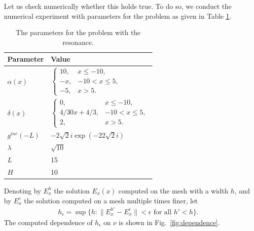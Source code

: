 Let us check numerically whether this holds true. 
To do so, we conduct the  numerical experiment with parameters for the problem as given in Table \ref{tab:parameters}.
\begin{table}[htb!]
\begin{tabular}{l|l}
Parameter & Value \\
\hline
$\alpha(x)$ & $\left\{\begin{array}{lr}
10, & x\leq -10,\\
-x, & -10<x\leq 5,\\
-5, & x>5.
\end{array}\right.$ \\
$\delta(x)$ & 
$\left\{\begin{array}{lr}
0, & x\leq -10,\\
4/30x+4/3,& -10<x\leq 5,\\
2, & x>5.
\end{array}\right.$ \\
$g^{inc}(-L)$ & $-2 \sqrt{2}i\exp(-22\sqrt{2}i)$\\
$\lambda$ & 
$\sqrt{10}$\\
$L$& 15\\
$H$ & 10 \\
\end{tabular}
\caption{The parameters for the problem with the resonance.}
\label{tab:parameters}
\end{table}
Denoting by $E_{x}^{h}$ the solution $E_{x}(x)$ computed on the mesh with a width $h$, and by $E_{x}^{c}$ the solution computed on a mesh multiple times finer, let 
\begin{align}
\label{eq:def_epsilon}
h_{\epsilon}=\sup\{h: \|E_{x}^{h'}-E_{x}^{c}\|<\epsilon \text{ for all } h'<h\}.
\end{align}
The computed dependence of $h_{\epsilon}$ on $\nu$ is shown in Fig.~\ref{fig:dependence}.
